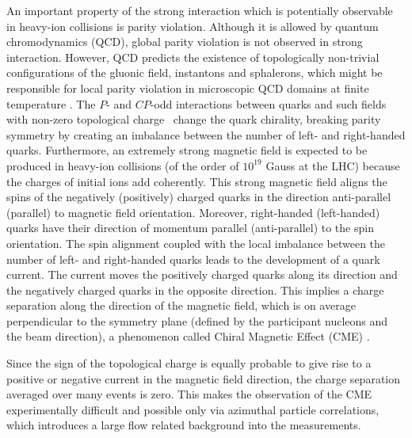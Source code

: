 An important property of the strong interaction which is potentially observable in heavy-ion collisions is parity violation. Although it is allowed by 
quantum chromodynamics (QCD), global parity violation is not observed in strong interaction. However, QCD predicts the existence of topologically 
non-trivial configurations of the gluonic field, instantons and sphalerons, which might be responsible for local parity violation in microscopic QCD 
domains at finite temperature \cite{Lee:1973iz, Lee:1974ma, Morley:1983wr, Kharzeev:1998kz}. The $P$- and $CP$-odd interactions between quarks 
and such fields with non-zero topological charge~\cite{Chern:1974ft} change the quark chirality, breaking parity symmetry by creating an imbalance 
between the number of left- and right-handed quarks. Furthermore, an extremely strong magnetic field is expected to be produced in heavy-ion collisions 
\cite{Deng:2012pc, Gursoy:2014aka} (of the order of $10^{19}$ Gauss at the LHC) because the charges of initial ions add coherently. This strong 
magnetic field aligns the spins of the negatively (positively) charged quarks in the direction anti-parallel (parallel) to magnetic field orientation. Moreover, 
right-handed (left-handed) quarks have their direction of momentum parallel (anti-parallel) to the spin orientation. The spin alignment coupled with the 
local imbalance between the number of left- and right-handed quarks leads to the development of a quark current. The current moves the positively 
charged quarks along its direction and the negatively charged quarks in the opposite direction. This implies a charge separation along the direction 
of the magnetic field, which is on average perpendicular to the symmetry plane (defined by the participant nucleons and the beam direction), a 
phenomenon called Chiral Magnetic Effect (CME) \cite{Kharzeev:2004ey, Kharzeev:2007tn, Kharzeev:2007jp, Fukushima:2008xe}. 

Since the sign of 
the topological charge is equally probable to give rise to a positive or negative current in the magnetic field direction, the charge separation averaged 
over many events is zero. This makes the observation of the CME experimentally difficult and possible only via azimuthal particle correlations, which 
introduces a large flow related background into the measurements.

